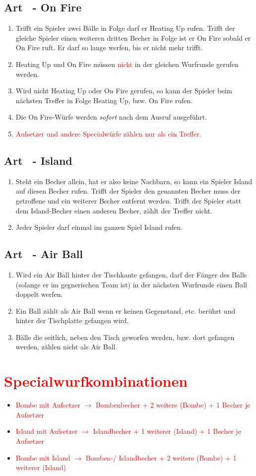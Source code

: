 \documentclass[a4paper,11pt]{scrartcl}
\newcommand{\enum}[1]{\begin{enumerate}[label=(\arabic*)]#1\end{enumerate}}
\newcommand{\art}[2]{\subsection*{#1} \enum{#2}}
\newcommand{\quot}[1]{\glqq #1\grqq}
\newcommand{\new}[1]{\textcolor{red}{#1}}
\newcounter{art}
\begin{document}
\art{Art \theart\ - \quot{On Fire}}{
    \item
        Trifft ein Spieler zwei Bälle in Folge darf er \quot{Heating Up} rufen. Trifft der gleiche Spieler einen weiteren dritten Becher in Folge ist er \quot{On Fire} sobald er \quot{On Fire} ruft. Er darf so lange werfen, bis er nicht mehr trifft.
    \item
        \quot{Heating Up} und \quot{On Fire} müssen \new{nicht} in der gleichen Wurfrunde gerufen werden.
    \item
        Wird nicht \quot{Heating Up} oder \quot{On Fire} gerufen, so kann der Spieler beim nächsten Treffer in Folge \quot{Heating Up}, bzw. \quot{On Fire} rufen.
    \item
        Die \quot{On Fire}-Würfe werden \emph{sofort} nach dem Ausruf ausgeführt.
    \item
        \new{Aufsetzer und andere Specialwürfe zählen nur als ein Treffer.}
}

\art{Art \theart\ - \quot{Island}}{
    \item
        Steht ein Becher allein, hat er also keine Nachbarn, so kann ein Spieler \quot{Island} auf diesen Becher rufen. Trifft der Spieler den genannten Becher muss der getroffene und ein weiterer Becher entfernt werden. Trifft der Spieler statt dem \quot{Island}-Becher einen anderen Becher, zählt der Treffer nicht.
    \item
        Jeder Spieler darf einmal im ganzen Spiel \quot{Island} rufen.
}

\art{Art \theart\ - \quot{Air Ball}}{
    \item
        Wird ein \quot{Air Ball} hinter der Tischkante gefangen, darf der Fänger des Balls (solange er im gegnerischen Team ist) in der nächsten Wurfrunde einen Ball doppelt werfen.
    \item
        Ein Ball zählt als \quot{Air Ball} wenn er keinen Gegenstand, etc. berührt und hinter der Tischplatte gefangen wird.
    \item
        Bälle die seitlich, neben den Tisch geworfen werden, bzw. dort gefangen werden, zählen nicht als \quot{Air Ball}.
}

\section{\new{Specialwurfkombinationen}}
    \begin{itemize}
        \item
            \new{Bombe mit Aufsetzer $\rightarrow$ Bombenbecher + 2 weitere (Bombe) + 1 Becher je Aufsetzer}
        \item
            \new{Island mit Aufsetzer $\rightarrow$ Islandbecher + 1 weiterer (Island) + 1 Becher je Aufsetzer}
        \item
            \new{Bombe mit Island $\rightarrow$ Bomben-/ Islandbecher + 2 weitere (Bombe) + 1 weiterer (Island)}
    \end{itemize}
\end{document}
